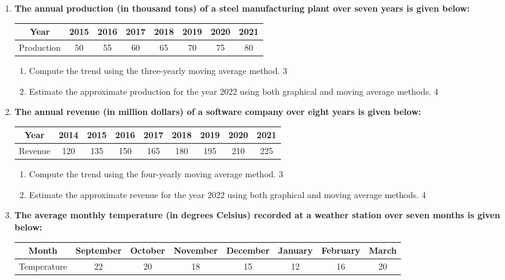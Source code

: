 \documentclass[a4paper,oneside]{book}
\begin{document}
\begin{enumerate}
\begin{enumerate}
  \item
\textbf{The annual production (in thousand tons) of a steel manufacturing plant over seven years is given below:}

\begin{table}[h]
\centering
\begin{tabular}{cccccccc}
Year     & 2015 & 2016 & 2017 & 2018 & 2019 & 2020 & 2021 \\ \hline
Production & 50   & 55   & 60   & 65   & 70   & 75   & 80   
\end{tabular}
\end{table}

\begin{enumerate}
    \item  
    Compute the trend using the three-yearly moving average method. \hfill 3
    \item
    Estimate the approximate production for the year 2022 using both graphical and moving average methods. \hfill 4
\end{enumerate}

\item
\textbf{The annual revenue (in million dollars) of a software company over eight years is given below:}

\begin{table}[h]
\centering
\begin{tabular}{ccccccccc}
Year & 2014 & 2015 & 2016 & 2017 & 2018 & 2019 & 2020 & 2021 \\ \hline
Revenue & 120 & 135 & 150 & 165 & 180 & 195 & 210 & 225
\end{tabular}
\end{table}

\begin{enumerate}
\item
Compute the trend using the four-yearly moving average method. \hfill 3
\item
Estimate the approximate revenue for the year 2022 using both graphical and moving average methods. \hfill 4
\end{enumerate}

\item
\textbf{The average monthly temperature (in degrees Celsius) recorded at a weather station over seven months is given below:}

\begin{table}[H]
\centering
\begin{tabular}{c|c|c|c|c|c|c|c}
Month & September & October & November & December & January & February & March \\ \hline
Temperature & 22 & 20 & 18 & 15 & 12 & 16 & 20
\end{tabular}
\end{table}


\end{enumerate}
\end{enumerate}
\end{document}
